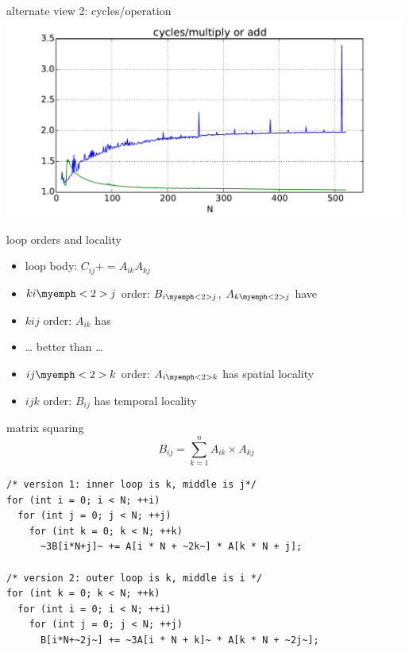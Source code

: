 \begin{frame}{alternate view 2: cycles/operation}
\includegraphics[width=0.99\textwidth]{../caching/k-inout-cpe}
\end{frame}

\begin{frame}{loop orders and locality}
\begin{itemize}
\item loop body: $C_{ij} += A_{ik}A_{kj}$
\item $ki\myemph<2>{j}$ order: $B_{i\myemph<2>{j}}$, $A_{k\myemph<2>{j}}$ have 
\item $kij$ order: $A_{ik}$ has 
\item \ldots{} better than \ldots{}
\item $ij\myemph<2>{k}$ order: $A_{i\myemph<2>{k}}$ has spatial locality
\item $ijk$ order: $B_{ij}$ has temporal locality
\end{itemize}
\end{frame}

\begin{frame}[fragile,label=matrixSquareTwoVersionsHilite]{matrix squaring}
\[ B_{ij} = \sum_{k=1}^n A_{ik}\times A_{kj} \]
\begin{lstlisting}
/* version 1: inner loop is k, middle is j*/
for (int i = 0; i < N; ++i)
  for (int j = 0; j < N; ++j)
    for (int k = 0; k < N; ++k)
      ~3B[i*N+j]~ += A[i * N + ~2k~] * A[k * N + j];

/* version 2: outer loop is k, middle is i */
for (int k = 0; k < N; ++k)
  for (int i = 0; i < N; ++i)
    for (int j = 0; j < N; ++j)
      B[i*N+~2j~] += ~3A[i * N + k]~ * A[k * N + ~2j~];
\end{lstlisting}
\end{frame}

